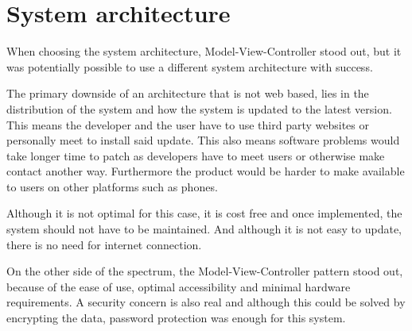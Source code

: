 \section{System architecture}	
When choosing the system architecture, Model-View-Controller stood out, but it was potentially possible to use a different system architecture with success.

The primary downside of an architecture that is not web based, lies in the distribution of the system and how the system is updated to the latest version.
This means the developer and the user have to use third party websites or personally meet to install said update.	
This also means software problems would take longer time to patch as developers have to meet users or otherwise make contact another way.	
Furthermore the product would be harder to make available to users on other platforms such as phones.	

Although it is not optimal for this case, it is cost free and once implemented, the system should not have to be maintained.	
And although it is not easy to update, there is no need for internet connection.	

On the other side of the spectrum, the Model-View-Controller pattern stood out, because of the ease of use, optimal accessibility and minimal hardware requirements.
A security concern is also real and although this could be solved by encrypting the data, password protection was enough for this system.